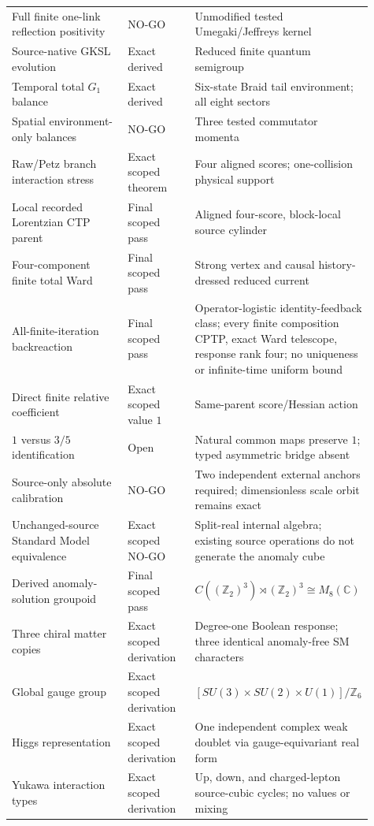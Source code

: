 \documentclass[11pt]{article}
\theoremstyle{definition}
\theoremstyle{remark}
\begin{document}
\begin{longtable}{>{\raggedright\arraybackslash}p{0.34\linewidth} >{\raggedright\arraybackslash}p{0.19\linewidth} >{\raggedright\arraybackslash}p{0.38\linewidth}}
Full finite one-link reflection positivity & NO-GO & Unmodified tested Umegaki/Jeffreys kernel \\
Source-native GKSL evolution & Exact derived & Reduced finite quantum semigroup \\
Temporal total $G_1$ balance & Exact derived & Six-state Braid tail environment; all eight sectors \\
Spatial environment-only balances & NO-GO & Three tested commutator momenta \\
Raw/Petz branch interaction stress & Exact scoped theorem & Four aligned scores; one-collision physical support \\
Local recorded Lorentzian CTP parent & Final scoped pass & Aligned four-score, block-local source cylinder \\
Four-component finite total Ward & Final scoped pass & Strong vertex and causal history-dressed reduced current \\
All-finite-iteration backreaction & Final scoped pass & Operator-logistic identity-feedback class; every finite composition CPTP, exact Ward telescope, response rank four; no uniqueness or infinite-time uniform bound \\
Direct finite relative coefficient & Exact scoped value $1$ & Same-parent score/Hessian action \\
$1$ versus $3/5$ identification & Open & Natural common maps preserve $1$; typed asymmetric bridge absent \\
Source-only absolute calibration & NO-GO & Two independent external anchors required; dimensionless scale orbit remains exact \\
Unchanged-source Standard Model equivalence & Exact scoped NO-GO & Split-real internal algebra; existing source operations do not generate the anomaly cube \\
Derived anomaly-solution groupoid & Final scoped pass & $C((\mathbb Z_2)^3)\rtimes(\mathbb Z_2)^3\cong M_8(\mathbb C)$ \\
Three chiral matter copies & Exact scoped derivation & Degree-one Boolean response; three identical anomaly-free SM characters \\
Global gauge group & Exact scoped derivation & $[SU(3)\times SU(2)\times U(1)]/\mathbb Z_6$ \\
Higgs representation & Exact scoped derivation & One independent complex weak doublet via gauge-equivariant real form \\
Yukawa interaction types & Exact scoped derivation & Up, down, and charged-lepton source-cubic cycles; no values or mixing \\

\end{longtable}
\end{document}
